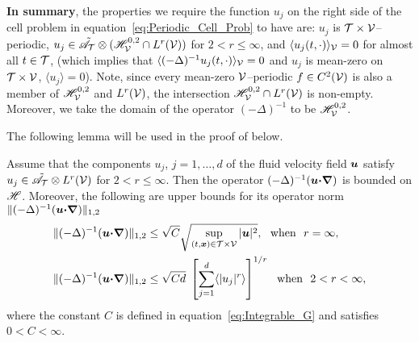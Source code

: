 \documentclass[amsa]{ipart}
\begin{document}
    

\textbf{In summary}, the properties we require the function $u_j$ on
the right side of the cell problem in
equation~\eqref{eq:Periodic_Cell_Prob} to have are: 
$u_j$ is $\mathcal{T}\times\mathcal{V}$--periodic, $u_j\in\tilde{\mathscr{A}}_{\mathcal{T}}\otimes(\mathscr{H}^{0,2}_{\mathcal{V}}\cap
L^r(\mathcal{V}))$ for $2<r\leq\infty$, and $\langle u_j(t,\cdot)\rangle_{\mathcal{V}}=0$ for almost all
$t\in\mathcal{T}$, (which implies that $\langle(-\Delta)^{-1}u_j(t,\cdot)\rangle_{\mathcal{V}}=0$ and $u_j$ is
mean-zero on $\mathcal{T}\times\mathcal{V}$, $\langle u_j\rangle=0$). Note, since every mean-zero
$\mathcal{V}$--periodic $f\in C^2(\mathcal{V})$ is also a member of $\mathscr{H}^{0,2}_{\mathcal{V}}$ and
$L^r(\mathcal{V})$, the intersection $\mathscr{H}^{0,2}_{\mathcal{V}}\cap L^r(\mathcal{V})$ is
non-empty. Moreover, we take the domain of the operator $(-\Delta)^{-1}$ to
be $\mathscr{H}^{0,2}_{\mathcal{V}}$.      






The following lemma will be used in the
proof of  below.
%
\begin{lemma}\label{lem:A_bounded}
%
Assume that the components $u_j$, $j=1,\ldots,d$ of the fluid velocity
field $\boldsymbol{u}$ satisfy $u_j\in\tilde{\mathscr{A}}_{\mathcal{T}}\otimes L^r(\mathcal{V})$ for
$2<r\leq\infty$. Then the operator $(-\Delta)^{-1}(\boldsymbol{u}\mbox{\boldmath${\cdot}$}\mbox{\boldmath${\nabla}$})$ is bounded
on $\mathscr{H}$. Moreover, the following are upper bounds for its operator
norm $\|(-\Delta)^{-1}(\boldsymbol{u}\mbox{\boldmath${\cdot}$}\mbox{\boldmath${\nabla}$})\|_{1,2}$ 
%
\begin{align}
  \|(-\Delta)^{-1}(\vecu\bcdot\bnabla)\|_{1,2}
  &\leq\sqrt{C}\sqrt{\sup_{(t,\vecx)\in\Tc\times\Vc}|\vecu|^2},
  ~\text{ when }~ r=\infty,
  \label{eq:Bound_A1}  
  \\
  \|(-\Delta)^{-1}(\vecu\bcdot\bnabla)\|_{1,2}
  &\leq\sqrt{Cd}\;\left[\sum_{j=1}^d\langle|u_j|^r\rangle\right]^{1/r}
  ~\text{ when }~ 2<r<\infty,
  \label{eq:Bound_A2}
\end{align}
%
where the constant $C$ is defined in equation~\eqref{eq:Integrable_G}
and satisfies $0<C<\infty$. 
%
\end{lemma}
%
\end{document}
